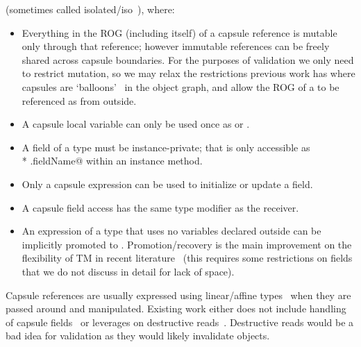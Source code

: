 (sometimes called isolated/iso~\cite{GordonEtAl12,clebsch2015deny,clebsch2017orca}), where:
\begin{itemize}
\item Everything in the ROG (including itself) of a capsule reference is mutable only through that reference; however immutable references can be freely shared across capsule boundaries.
For the purposes of validation we only need to restrict mutation, so we may relax the restrictions previous work has where capsules are `balloons'~\cite{Almeida97,ServettoEtAl13a} in the object graph, and allow the ROG of a \Q@capsule@ to be referenced as \Q@read@ from outside.
\item A capsule local variable can only be used once as \Q@capsule@ or \Q@mut@.
\item A field of a \Q@capsule@ type must be instance-private; that is only accessible as\\* \Q@this.fieldName@ within an instance method.
\item Only a capsule expression can be used to initialize or update a \Q@capsule@ field.
\item A capsule field access has the same type modifier as the receiver.
\item An expression of a \Q@mut@ type that uses no \Q@mut@ variables declared outside can be implicitly promoted to \Q@capsule@. Promotion/recovery is the main improvement on the flexibility of TM in recent literature~\cite{ServettoEtAl13a,ServettoZucca15,GordonEtAl12,clebsch2015deny,clebsch2017orca}
(this requires some restrictions on \Q@read@ fields that we do not discuss in detail for lack of space).
\end{itemize}

\noindent Capsule references are usually expressed using linear/affine types~\cite{boyland2001alias} when they are passed around and manipulated. Existing work either does not include handling of capsule fields~\cite{ServettoEtAl13a,ServettoZucca15} or leverages on destructive reads~\cite{GordonEtAl12,clebsch2015deny}.
Destructive reads would be a bad idea for validation as they would likely invalidate objects.

